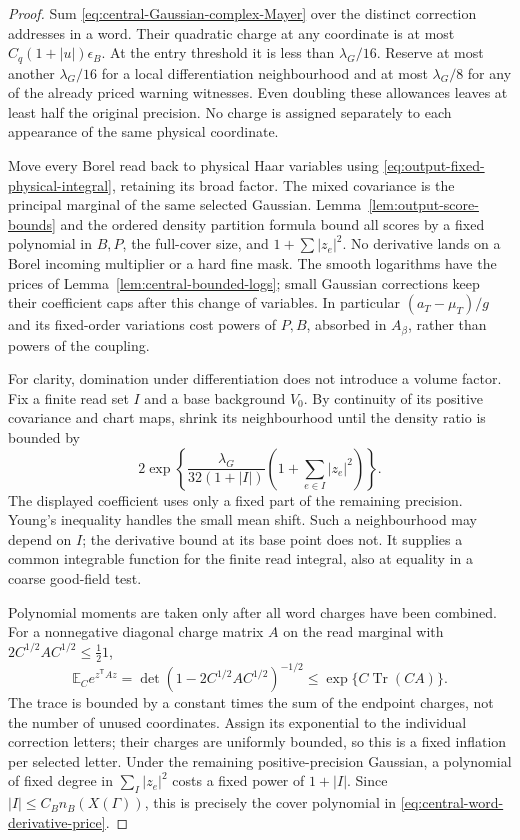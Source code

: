 \documentclass[11pt,reqno]{amsart}
\numberwithin{equation}{section}
\theoremstyle{definition}
\theoremstyle{remark}
\begin{document}
\begin{proof}
Sum \eqref{eq:central-Gaussian-complex-Mayer} over the
distinct correction addresses in a word. Their quadratic
charge at any coordinate is at most
\(C_q(1+|u|)\epsilon_B\). At the entry threshold it is
less than \(\lambda_G/16\). Reserve at most another
\(\lambda_G/16\) for a local differentiation neighbourhood
and at most \(\lambda_G/8\) for any of the already priced
warning witnesses. Even doubling these allowances leaves
at least half the original precision. No charge is assigned
separately to each appearance of the same physical coordinate.

Move every Borel read back to physical Haar variables using
\eqref{eq:output-fixed-physical-integral}, retaining its broad
factor. The mixed covariance is the principal marginal of
the same selected Gaussian. Lemma~\ref{lem:output-score-bounds}
and the ordered density partition formula bound all scores
by a fixed polynomial in \(B,P\), the full-cover size, and
\(1+\sum |z_e|^2\). No derivative lands on a Borel incoming
multiplier or a hard fine mask. The smooth logarithms have
the prices of Lemma~\ref{lem:central-bounded-logs}; small
Gaussian corrections keep their coefficient caps after this
change of variables. In particular \((a_T-\mu_T)/g\) and its
fixed-order variations cost powers of \(P,B\), absorbed in
\(A_\beta\), rather than powers of the coupling.

For clarity, domination under differentiation does not
introduce a volume factor. Fix a finite read set \(I\) and
a base background \(V_0\). By continuity of its positive
covariance and chart maps, shrink its neighbourhood until
the density ratio is bounded by
\[
 2\exp\left\{\frac{\lambda_G}{32(1+|I|)}
                         \left(1+\sum_{e\in I}|z_e|^2\right)\right\}.
\]
The displayed coefficient uses only a fixed part of the
remaining precision. Young's inequality handles the small
mean shift. Such a neighbourhood may depend on
\(I\); the derivative bound at its base point does not.
It supplies a common integrable function for the finite
read integral, also at equality in a coarse good-field test.

Polynomial moments are taken only after all word charges
have been combined. For a nonnegative diagonal charge
matrix \(A\) on the read marginal with
\(2C^{1/2}AC^{1/2}\le\frac12 1\),
\[
 \mathbb E_Ce^{z^{\mathsf T}Az}
   =\det(1-2C^{1/2}AC^{1/2})^{-1/2}
   \le \exp\{C\operatorname{Tr}(CA)\}.
\]
The trace is bounded by a constant times the sum of the
endpoint charges, not the number of unused coordinates.
Assign its exponential to the individual correction
letters; their charges are uniformly bounded, so this is
a fixed inflation per selected letter. Under the remaining
positive-precision Gaussian, a polynomial of fixed degree
in \(\sum_{I}|z_e|^2\) costs a fixed power of \(1+|I|\).
Since \(|I|\le C_B n_B(X(\Gamma))\), this is precisely
the cover polynomial in
\eqref{eq:central-word-derivative-price}.


\end{proof}
\end{document}
